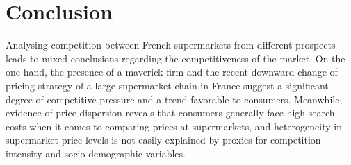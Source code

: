\documentclass[english]{article}
\begin{document}
\section{Conclusion}

Analysing competition between French supermarkets from different prospects leads to mixed conclusions regarding the competitiveness of the market. On the one hand, the presence of a maverick firm and the recent downward change of pricing strategy of a large supermarket chain in France suggest a significant degree of competitive pressure and a trend favorable to consumers. Meanwhile, evidence of price dispersion reveals that consumers generally face high search costs when it comes to comparing prices at supermarkets, and heterogeneity in supermarket price levels is not easily explained by proxies for competition intensity and socio-demographic variables.

\newpage



\newpage


\end{document}
